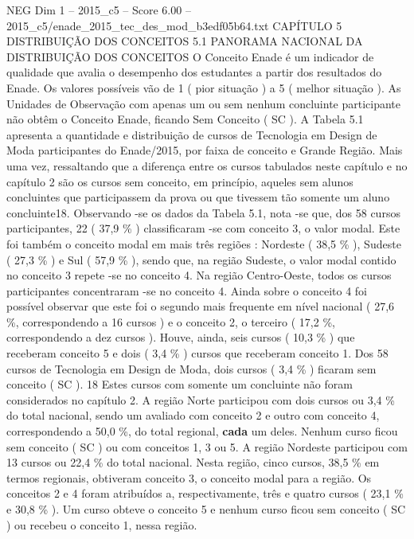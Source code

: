 \begin{textsample}{NEG Dim 1 – 2015\_c5 – Score 6.00 – 2015\_c5/enade\_2015\_tec\_des\_mod\_b3edf05b64.txt}  \label{ex:f1_neg_341}
CAPÍTULO 5 DISTRIBUIÇÃO DOS CONCEITOS 5.1 PANORAMA NACIONAL DA DISTRIBUIÇÃO DOS CONCEITOS O Conceito Enade é um indicador de qualidade que avalia o desempenho dos estudantes a partir dos resultados do Enade.
Os valores possíveis vão de 1 ( pior situação ) a 5 ( melhor situação ).
As Unidades de Observação com apenas um ou sem nenhum concluinte participante não obtêm o Conceito Enade, ficando Sem Conceito ( SC ).
A Tabela 5.1 apresenta a quantidade e distribuição de cursos de Tecnologia em Design de Moda participantes do Enade/2015, por faixa de conceito e Grande Região.
Mais uma vez, ressaltando que a diferença entre os cursos tabulados neste capítulo e no capítulo 2 são os cursos sem conceito, em princípio, aqueles sem alunos concluintes que participassem da prova ou que tivessem tão somente um aluno concluinte18.
Observando -se os dados da Tabela 5.1, nota -se que, dos 58 cursos participantes, 22 ( 37,9 \% ) classificaram -se com conceito 3, o valor modal.
Este foi também o conceito modal em mais três regiões : Nordeste ( 38,5 \% ), Sudeste ( 27,3 \% ) e Sul ( 57,9 \% ), sendo que, na região Sudeste, o valor modal contido no conceito 3 repete -se no conceito 4.
Na região Centro-Oeste, todos os cursos participantes concentraram -se no conceito 4.
Ainda sobre o conceito 4 foi possível observar que este foi o segundo mais frequente em nível nacional ( 27,6 \%, correspondendo a 16 cursos ) e o conceito 2, o terceiro ( 17,2 \%, correspondendo a dez cursos ).
Houve, ainda, seis cursos ( 10,3 \% ) que receberam conceito 5 e dois ( 3,4 \% ) cursos que receberam conceito 1.
Dos 58 cursos de Tecnologia em Design de Moda, dois cursos ( 3,4 \% ) ficaram sem conceito ( SC ). 18 Estes cursos com somente um concluinte não foram considerados no capítulo 2.
A região Norte participou com dois cursos ou 3,4 \% do total nacional, sendo um avaliado com conceito 2 e outro com conceito 4, correspondendo a 50,0 \%, do total regional, \textbf{cada} um deles.
Nenhum curso ficou sem conceito ( SC ) ou com conceitos 1, 3 ou 5.
A região Nordeste participou com 13 cursos ou 22,4 \% do total nacional.
Nesta região, cinco cursos, 38,5 \% em termos regionais, obtiveram conceito 3, o conceito modal para a região.
Os conceitos 2 e 4 foram atribuídos a, respectivamente, três e quatro cursos ( 23,1 \% e 30,8 \% ).
Um curso obteve o conceito 5 e nenhum curso ficou sem conceito ( SC ) ou recebeu o conceito 1, nessa região.

\end{textsample}
